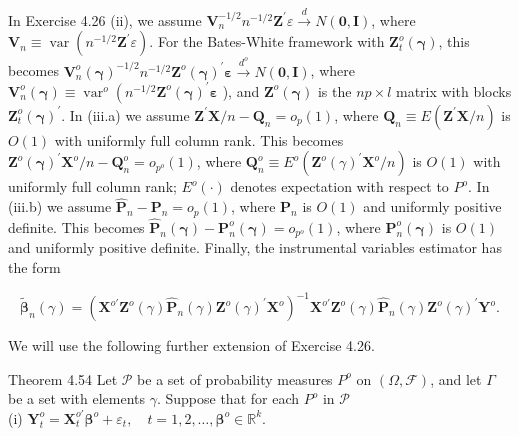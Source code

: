 \documentclass[10pt]{article}
\begin{document}
In Exercise 4.26 (ii), we assume $\mathbf{V}_{n}^{-1 / 2} n^{-1 / 2} \mathbf{Z}^{\prime} \varepsilon \xrightarrow{d} N(\mathbf{0}, \mathbf{I})$, where $\mathbf{V}_{n} \equiv \operatorname{var}\left(n^{-1 / 2} \mathbf{Z}^{\prime} \varepsilon\right)$. For the Bates-White framework with $\mathbf{Z}_{t}^{o}(\boldsymbol{\gamma})$, this becomes $\mathbf{V}_{n}^{o}(\boldsymbol{\gamma})^{-1 / 2} n^{-1 / 2} \mathbf{Z}^{o}(\boldsymbol{\gamma})^{\prime} \boldsymbol{\varepsilon} \xrightarrow{d^{o}} N(\mathbf{0}, \mathbf{I})$, where $\mathbf{V}_{n}^{o}(\boldsymbol{\gamma}) \equiv \operatorname{var}^{o}\left(n^{-1 / 2}\right. \mathbf{Z}^{o}(\boldsymbol{\gamma})^{\prime} \boldsymbol{\varepsilon}$ ), and $\mathbf{Z}^{o}(\boldsymbol{\gamma})$ is the $n p \times l$ matrix with blocks $\mathbf{Z}_{t}^{o}(\boldsymbol{\gamma})^{\prime}$. In (iii.a) we assume $\mathbf{Z}^{\prime} \mathbf{X} / n-\mathbf{Q}_{n}=o_{p}(1)$, where $\mathbf{Q}_{n} \equiv E\left(\mathbf{Z}^{\prime} \mathbf{X} / n\right)$ is $O(1)$ with uniformly full column rank. This becomes $\mathbf{Z}^{o}(\boldsymbol{\gamma})^{\prime} \mathbf{X}^{o} / n-\mathbf{Q}_{n}^{o}=o_{p^{o}}(1)$, where $\mathbf{Q}_{n}^{o} \equiv E^{o}\left(\mathbf{Z}^{o}(\gamma)^{\prime} \mathbf{X}^{o} / n\right)$ is $O(1)$ with uniformly full column rank; $E^{o}(\cdot)$ denotes expectation with respect to $P^{o}$. In (iii.b) we assume $\hat{\mathbf{P}}_{n}-\mathbf{P}_{n}= o_{p}(1)$, where $\mathbf{P}_{n}$ is $O(1)$ and uniformly positive definite. This becomes $\hat{\mathbf{P}}_{n}(\boldsymbol{\gamma})-\mathbf{P}_{n}^{o}(\boldsymbol{\gamma})=o_{p^{o}}(1)$, where $\mathbf{P}_{n}^{o}(\boldsymbol{\gamma})$ is $O(1)$ and uniformly positive definite. Finally, the instrumental variables estimator has the form

$$
\tilde{\boldsymbol{\beta}}_{n}(\gamma)=\left(\mathbf{X}^{o \prime} \mathbf{Z}^{o}(\gamma) \hat{\mathbf{P}}_{n}(\gamma) \mathbf{Z}^{o}(\gamma)^{\prime} \mathbf{X}^{o}\right)^{-1} \mathbf{X}^{o \prime} \mathbf{Z}^{o}(\gamma) \hat{\mathbf{P}}_{n}(\gamma) \mathbf{Z}^{o}(\gamma)^{\prime} \mathbf{Y}^{o} .
$$

We will use the following further extension of Exercise 4.26.

Theorem 4.54 Let $\mathcal{P}$ be a set of probability measures $P^{o}$ on $(\Omega, \mathcal{F})$, and let $\Gamma$ be a set with elements $\gamma$. Suppose that for each $P^{o}$ in $\mathcal{P}$\\
(i) $\mathbf{Y}_{t}^{o}=\mathbf{X}_{t}^{o \prime} \boldsymbol{\beta}^{o}+\varepsilon_{t}, \quad t=1,2, \ldots, \boldsymbol{\beta}^{o} \in \mathbb{R}^{k}$.
\end{document}

